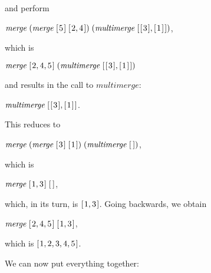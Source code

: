 \documentclass{scrreprt}
\newcommand{\Varid}[1]{\mathit{#1}}
\begin{document}
and perform

\ensuremath{\Varid{merge}\;(\Varid{merge}\;[\mskip1.5mu \mathrm{5}\mskip1.5mu]\;[\mskip1.5mu \mathrm{2},\mathrm{4}\mskip1.5mu])\;(\Varid{multimerge}\;[\mskip1.5mu [\mskip1.5mu \mathrm{3}\mskip1.5mu],[\mskip1.5mu \mathrm{1}\mskip1.5mu]\mskip1.5mu])},

which is 

\ensuremath{\Varid{merge}\;[\mskip1.5mu \mathrm{2},\mathrm{4},\mathrm{5}\mskip1.5mu]\;(\Varid{multimerge}\;[\mskip1.5mu [\mskip1.5mu \mathrm{3}\mskip1.5mu],[\mskip1.5mu \mathrm{1}\mskip1.5mu]\mskip1.5mu])}

and results in the call to \ensuremath{\Varid{multimerge}}:

\ensuremath{\Varid{multimerge}\;[\mskip1.5mu [\mskip1.5mu \mathrm{3}\mskip1.5mu],[\mskip1.5mu \mathrm{1}\mskip1.5mu]\mskip1.5mu]}.

This reduces to

\ensuremath{\Varid{merge}\;(\Varid{merge}\;[\mskip1.5mu \mathrm{3}\mskip1.5mu]\;[\mskip1.5mu \mathrm{1}\mskip1.5mu])\;(\Varid{multimerge}\;[\mskip1.5mu \mskip1.5mu])},

which is

\ensuremath{\Varid{merge}\;[\mskip1.5mu \mathrm{1},\mathrm{3}\mskip1.5mu]\;[\mskip1.5mu \mskip1.5mu]},

which, in its turn, is \ensuremath{[\mskip1.5mu \mathrm{1},\mathrm{3}\mskip1.5mu]}. 
Going backwards, we obtain

\ensuremath{\Varid{merge}\;[\mskip1.5mu \mathrm{2},\mathrm{4},\mathrm{5}\mskip1.5mu]\;[\mskip1.5mu \mathrm{1},\mathrm{3}\mskip1.5mu]},

which is \ensuremath{[\mskip1.5mu \mathrm{1},\mathrm{2},\mathrm{3},\mathrm{4},\mathrm{5}\mskip1.5mu]}.

We can now put everything together:
\end{document}
